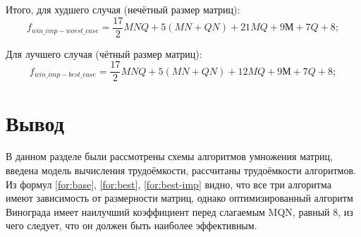 Итого, для худшего случая (нечётный размер матриц): 
\begin{equation}
	\label{for:worst-imp}
	f_{win\_imp-worst\_case}=\frac{17}{2}MNQ+5(MN+QN)+21MQ+9М+7Q+8;
\end{equation}

Для лучшего случая (чётный размер матриц): 
\begin{equation}
	\label{for:best-imp}
	f_{win\_imp-best\_case}=\frac{17}{2}MNQ+5(MN+QN)+12MQ+9М+7Q+8;
\end{equation}

\section{Вывод}

В данном разделе были рассмотрены схемы алгоритмов умножения
матриц, введена модель вычисления трудоёмкости, рассчитаны трудоёмкости
алгоритмов. Из формул \ref{for:base}, \ref{for:best}, \ref{for:best-imp} видно, что все три алгоритма имеют зависимость от размерности матриц,
однако оптимизированный алгоритм Винограда имеет наилучший коэффициент перед слагаемым MQN, равный 8, из чего
следует, что он должен быть наиболее эффективным.